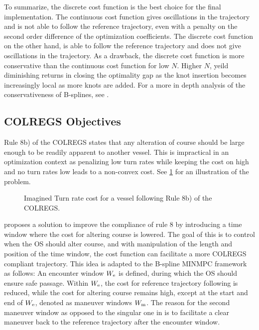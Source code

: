 \FloatBarrier
To summarize, the discrete cost function is the best choice for the final implementation. The continuous cost function gives oscillations in the trajectory and is not able to follow the reference trajectory, even with a penalty on the second order difference of the optimization coefficients. The discrete cost function on the other hand, is able to follow the reference trajectory and does not give oscillations in the trajectory. As a drawback, the discrete cost function is more conservative than the continuous cost function for low $N$. Higher $N$, yeild diminishing returns in closing the optimality gap as the knot insertion becomes increasingly local as more knots are added.
For a more in depth analysis of the conservativeness of B-splines, see \citet{Grimstad2016}.


\subsection{COLREGS Objectives}
Rule 8b) of the COLREGS states that any alteration of course should be large enough to be readily apparent to another vessel. This is impractical in an optimization context as penalizing low turn rates while keeping the cost on high and no turn rates low leads to a non-convex cost. See \cref{fig:turn-rate-cost} for an illustration of the problem. 

\begin{figure}
    \centering
    
    \caption{Imagined Turn rate cost for a vessel following Rule 8b) of the COLREGS.}
    \label{fig:turn-rate-cost}
\end{figure}

\cite{Thyri2022-MPC} proposes a solution to improve the compliance of rule 8 by introducing a time window where the cost for altering course is lowered. The goal of this is to control when the OS should alter course, and with manipulation of the length and position of the time window, the cost function can facilitate a more COLREGS compliant trajectory. This idea is adapted to the B-spline MINMPC framework as follows:
An encounter window $W_\text e$ is defined, during which the OS should ensure safe passage. Within $W_\text e$, the cost for reference trajectory following is reduced, while the cost for altering course remains high, except at the start and end of $W_\text e$, denoted as maneuver windows $W_\text m$. 
The reason for the second maneuver window as opposed to the singular one in \cite{Thyri2022-MPC} is to facilitate a clear maneuver back to the reference trajectory after the encounter window.


